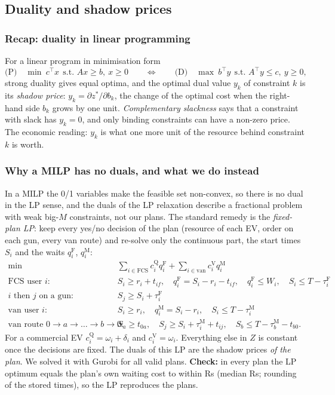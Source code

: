\subsection{Duality and shadow prices}
\label{sec:duals}

\subsubsection{Recap: duality in linear programming}
For a linear program in minimisation form
\[
\text{(P)}\quad \min\ c^{\top}x\ \ \text{s.t. } Ax\ge b,\ x\ge0
\qquad\Longleftrightarrow\qquad
\text{(D)}\quad \max\ b^{\top}y\ \ \text{s.t. } A^{\top}y\le c,\ y\ge0 ,
\]
strong duality gives equal optima, and the optimal dual value $y_k$ of constraint $k$ is its \emph{shadow price}: $y_k=\partial z^{*}/\partial b_k$, the change of the optimal cost when the right-hand side $b_k$ grows by one unit. \emph{Complementary slackness} says that a constraint with slack has $y_k=0$, and only binding constraints can have a non-zero price. The economic reading: $y_k$ is what one more unit of the resource behind constraint $k$ is worth.

\subsubsection{Why a MILP has no duals, and what we do instead}
In a MILP the 0/1 variables make the feasible set non-convex, so there is no dual in the LP sense, and the duals of the LP relaxation describe a fractional problem with weak big-$M$ constraints, not our plans. The standard remedy is the \emph{fixed-plan LP}: keep every yes/no decision of the plan (resource of each EV, order on each gun, every van route) and re-solve only the continuous part, the start times $S_i$ and the waits $q^{\mathrm F}_i$, $q^{\mathrm M}_i$:
\begin{align*}
\min\ & \textstyle\sum_{i\in\text{FCS}} c^{\mathrm Q}_i q^{\mathrm F}_i+\sum_{i\in\text{van}} c^{\mathrm V}_i q^{\mathrm M}_i\\
\text{FCS user } i:\ & S_i\ge r_i+t_{if},\quad q^{\mathrm F}_i=S_i-r_i-t_{if},\quad q^{\mathrm F}_i\le W_i,\quad S_i\le T-\tau^{\mathrm F}_i\\
i\text{ then }j\text{ on a gun}:\ & S_j\ge S_i+\tau^{\mathrm F}_i\\
\text{van user } i:\ & S_i\ge r_i,\quad q^{\mathrm M}_i=S_i-r_i,\quad S_i\le T-\tau^{\mathrm M}_i\\
\text{van route } 0\to a\to\dots\to b\to0:\ & S_a\ge t_{0a},\quad S_j\ge S_i+\tau^{\mathrm M}_i+t_{ij},\quad S_b\le T-\tau^{\mathrm M}_b-t_{b0}.
\end{align*}
For a commercial EV $c^{\mathrm Q}_i=\omega_i+\delta_i$ and $c^{\mathrm V}_i=\omega_i$. Everything else in $Z$ is constant once the decisions are fixed. The duals of this LP are the shadow prices \emph{of the plan}. We solved it with Gurobi for all \NLPPlans{} valid plans. \textbf{Check:} in every plan the LP optimum equals the plan's own waiting cost to within \LPDiffMax{} Rs (median \LPDiffMedian{} Rs; rounding of the stored times), so the LP reproduces the plans.

